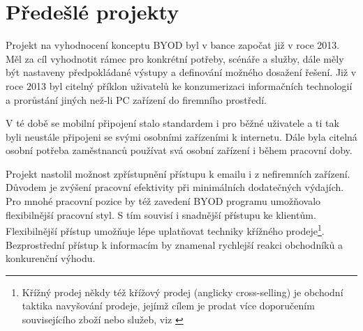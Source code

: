 \begin{table}[]

\centering


\caption{Tabulka aktuálního stavu podpory pro jednotlivé typy zařízení podle typu vlastnictví}
\label{tabulka1}

\end{table}


\section{Předešlé projekty}
Projekt na vyhodnocení konceptu BYOD byl v bance započat již v roce 2013. Měl za cíl vyhodnotit rámec pro konkrétní potřeby, scénáře a služby, dále měly být nastaveny předpokládané výstupy a definování možného dosažení řešení. Již v roce 2013 byl citelný příklon uživatelů ke konzumerizaci informačních technologií a prorůstání jiných než-li PC zařízení do firemního prostředí.

V té době se mobilní připojení stalo standardem i pro běžné uživatele a ti tak byli neustále připojeni se svými osobními zařízeními k internetu. Dále byla citelná osobní potřeba zaměstnanců používat svá osobní zařízení i během pracovní doby.

Projekt nastolil možnost zpřístupnění přístupu k emailu i z nefiremních zařízení. Důvodem je zvýšení pracovní efektivity při minimálních dodatečných výdajích. Pro mnohé pracovní pozice by též zavedení BYOD programu umožňovalo flexibilnější pracovní styl. S tím souvisí i snadnější přístupu ke klientům. 
Flexibilnější přístup umožňuje lépe uplatňovat techniky křížného prodeje\footnote{Křížný prodej někdy též křížový prodej (anglicky cross-selling) je obchodní taktika navyšování prodeje, jejímž cílem je prodat více doporučením souvisejícího zboží nebo služeb, viz \cite{ManagementMania}}. Bezprostřední přístup k informacím by znamenal rychlejší reakci obchodníků a konkurenční výhodu. 

